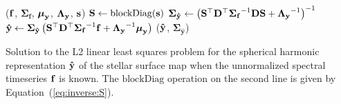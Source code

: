 \documentclass[modern]{aastex631}
\begin{document}
\begin{algorithm}
    \begin{spacing}{1.25}
        \begin{fminipage}{0.98\textwidth}
            \vspace{1em}
            \begin{algorithmic}
                (${\mathbf{f}}$, $\boldsymbol{\Sigma}_\mathbf{f}$, $\boldsymbol{\mu}_{\mathbf{y}}$, $\boldsymbol{\Lambda}_{\mathbf{y}}$, ${\mathbf{s}}$)
                \STATE
                $
                {\mathbf{S}} \gets \mathrm{blockDiag}({\mathbf{s}})
                $
                \STATE 
                $
                \boldsymbol{\Sigma}_{\mathbf{\hat{y}}}
                \gets
                \left(
                {\mathbf{S}}^\top{\ensuremath{\mathbf{D}}}^\top
                {\boldsymbol{\Sigma}_{\ensuremath{\mathbf{f}}}}^{-1}
                {\mathbf{D}}{\mathbf{S}}
                +
                {\boldsymbol{\Lambda}_{\mathbf{y}}}^{-1}
                \right)^{-1}
                $
                \STATE 
                $
                {\mathbf{\hat{y}}} 
                \gets 
                \boldsymbol{\Sigma}_\mathbf{\hat{y}}
                \left(
                {\mathbf{S}}^\top{\ensuremath{\mathbf{D}}}^\top
                {\boldsymbol{\Sigma}_\mathbf{f}}^{-1}
                {\mathbf{f}}
                +
                {\boldsymbol{\Lambda}_{\mathbf{y}}}^{-1} \boldsymbol{\mu}_{\mathbf{y}}
                \right)
                $
                \RETURN (${\mathbf{\hat{y}}}$, $\boldsymbol{\Sigma}_\mathbf{\hat{y}}$)
                \ENDFUNCTION
            \end{algorithmic}
            \vspace{1em}
        \end{fminipage}
    \end{spacing}
    \caption{Solution to the L2 linear least squares problem for the spherical harmonic representation ${\mathbf{\hat{y}}}$ of the stellar surface map when the unnormalized spectral timeseries ${\mathbf{f}}$ is known.
    The $\mathrm{blockDiag}$ operation on the second line is given by Equation~(\ref{eq:inverse:S}).
    \label{alg:solve1}}
\end{algorithm}
\end{document}
